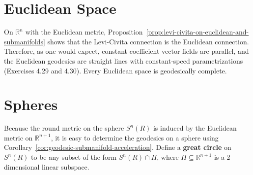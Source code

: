 \section{Euclidean Space}

On $\mathbb{R}^n$ with the Euclidean metric, Proposition~\ref{prop:levi-civita-on-euclidean-and-submanifolds} shows that the Levi-Civita connection is the Euclidean connection. Therefore, as one would expect, constant-coefficient vector fields are parallel, and the Euclidean geodesics are straight lines with constant-speed parametrizations (Exercises 4.29 and 4.30). Every Euclidean space is geodesically complete.

\section{Spheres}

Because the round metric on the sphere $S^n(R)$ is induced by the Euclidean metric on $\mathbb{R}^{n+1}$, it is easy to determine the geodesics on a sphere using Corollary~\ref{cor:geodesic-submanifold-acceleration}. Define a \textbf{great circle} on $S^n(R)$ to be any subset of the form $S^n(R) \cap \Pi$, where $\Pi \subseteq \mathbb{R}^{n+1}$ is a 2-dimensional linear subspace.

